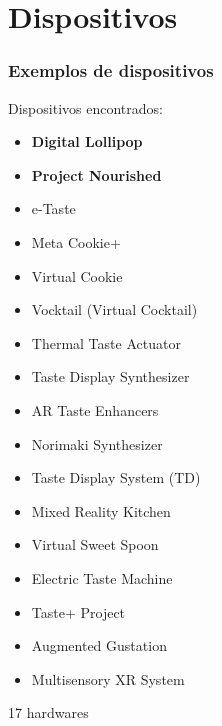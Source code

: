 \documentclass{beamer}
\begin{document}
\section{Dispositivos}
\begin{frame}
  \frametitle{Exemplos de dispositivos}
  Dispositivos encontrados:
  \begin{multicols}{2}
    \begin{itemize}
      \item \textbf{Digital Lollipop}
      \item \textbf{Project Nourished}
      \item e-Taste
      \item Meta Cookie+
      \item Virtual Cookie
      \item Vocktail (Virtual Cocktail)
      \item Thermal Taste Actuator
      \item Taste Display Synthesizer
      \item AR Taste Enhancers
      \item Norimaki Synthesizer
      \item Taste Display System (TD)
      \item Mixed Reality Kitchen
      \item Virtual Sweet Spoon
      \item Electric Taste Machine
      \item Taste+ Project
      \item Augmented Gustation
      \item Multisensory XR System
    \end{itemize}
  \end{multicols}  
  \begin{flushright}
    \scriptsize
    17 hardwares
  \end{flushright}
\end{frame}
\end{document}
